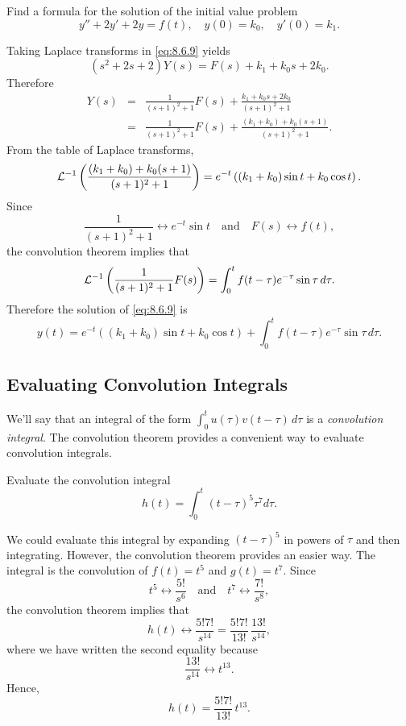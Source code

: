 \documentclass{ximera}
\begin{document}
\begin{example}\label{example:8.6.4}
  Find a formula for the solution of the initial value problem
\begin{equation}\label{eq:8.6.9}
y''+2y'+2y=f(t),\quad y(0)=k_0,\quad y'(0)=k_1.
\end{equation}
\begin{explanation}
Taking Laplace transforms in \eqref{eq:8.6.9} yields
$$
(s^2+2s+2)Y(s)=F(s)+k_1+k_0s+2k_0.
$$
Therefore
\begin{eqnarray*}
Y(s)&=&\frac{1}{(s+1)^2+1}F(s)+\frac{k_1+k_0s+2k_0}{(s+1)^2+1}\\
&=&\frac{1}{(s+1)^2+1}F(s)+\frac{(k_1+k_0)+k_0(s+1)}{(s+1)^2+1}.
\end{eqnarray*}
From the table of Laplace transforms,
$$
{\cal L}^{-1}\left(\frac{(k_1+k_0)+k_0(s+1)}{(s+1)^2+1}\right)=
e^{-t}\left((k_1+k_0)\sin t+k_0\cos t\right).
$$
Since
$$
\frac{1}{(s+1)^2+1}\leftrightarrow e^{-t}\sin t\quad\mbox{and}\quad
 F(s)\leftrightarrow f(t),
$$
the convolution theorem implies that
$$
{\cal L}^{-1}\left(\frac{1}{(s+1)^2+1}F(s)\right)=
\int_0^t  f(t-\tau)e^{-\tau}\sin\tau
\,d\tau.
$$
Therefore the solution of  \eqref{eq:8.6.9} is
\begin{equation}\label{eq:8.6.10}
y(t)=e^{-t}\left((k_1+k_0)\sin t+k_0\cos
t\right)+\int_0^tf(t-\tau)e^{-\tau}\sin\tau\,d\tau.
\end{equation}
\end{explanation}
\end{example}

\subsection*{Evaluating Convolution Integrals}

We'll say that an integral of the form $\int_0^t
u(\tau)v(t-\tau)\,d\tau$ is a \textit{convolution integral}. The
convolution theorem provides a convenient way to evaluate convolution
integrals.

\begin{example}\label{example:8.6.5}
 Evaluate the convolution integral
$$
h(t)=\int_0^t(t-\tau)^5\tau^7 d\tau.
$$
\begin{explanation}
We could evaluate this integral by expanding
$(t-\tau)^5$ in powers of $\tau$ and then integrating. However, the
convolution theorem provides an easier way. The integral is the
convolution of $f(t)=t^5$ and $g(t)=t^7$. Since
$$
t^5\leftrightarrow \frac{5!}{s^6}\quad\mbox{and}\quad  t^7
\leftrightarrow \frac{7!}{s^8},
$$
the convolution theorem implies that
$$
h(t)\leftrightarrow \frac{5!7!}{s^{14}}=\frac{5!7!}{13!}\, \frac{13!}{s^{14}},
$$
where we have written the second equality because
$$
\frac{13!}{ s^{14}}\leftrightarrow t^{13}.
$$
Hence,
$$
h(t)=\frac{5!7!}{13!}\, t^{13}.
$$
\end{explanation}
\end{example}
\end{document}
